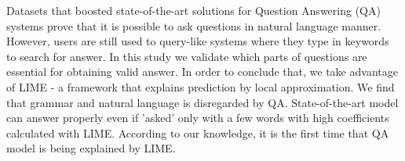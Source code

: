 Datasets that boosted state-of-the-art solutions for Question Answering (QA) systems prove that it is possible to ask questions in natural language manner. However, users are still used to query-like systems where they type in keywords to search for answer. In this study we validate which parts of questions are essential for obtaining valid answer. In order to conclude that, we take advantage of LIME - a framework that explains prediction by local approximation. We find that grammar and natural language is disregarded by QA. State-of-the-art model can answer properly even if 'asked' only with a few words with high coefficients calculated with LIME. According to our knowledge, it is the first time that QA model is being explained by LIME.
